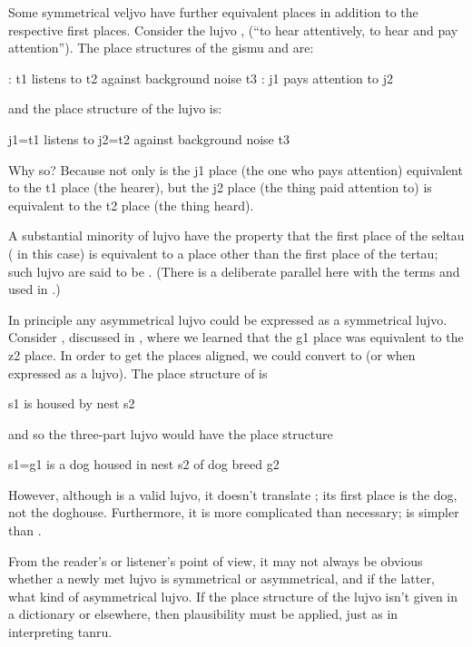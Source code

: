 Some symmetrical veljvo have further equivalent places in
    addition to the respective first places. Consider the lujvo
    ,  (``to hear attentively, to hear and
    pay attention''). The place structures of the gismu 
    and  are:
\begin{example}
: t1 listens to t2 against background noise t3\n
{}: j1 pays attention to j2
\end{example}

{\noindent}and the place structure of the lujvo is:
\begin{example}
j1=t1 listens to j2=t2 against background noise t3
\end{example}

Why so? Because not only is the j1 place (the one who pays
    attention) equivalent to the t1 place (the hearer), but the j2
    place (the thing paid attention to) is equivalent to the t2
    place (the thing heard).

A substantial minority of lujvo have the property that the
    first place of the seltau ( in this case) is
    equivalent to a place other than the first place of the tertau;
    such lujvo are said to be . (There is a
    deliberate parallel here with the terms 
    and  used in .)

In principle any asymmetrical lujvo could be expressed as a
    symmetrical lujvo. Consider , discussed in , where we learned that the g1 place
    was equivalent to the z2 place. In order to get the places
    aligned, we could convert  to  (or
     when expressed as a lujvo). The place structure of
     is
\begin{example}
s1 is housed by nest s2
\end{example}

{\noindent}and so the three-part lujvo  would have the place
    structure
\begin{example}
s1=g1 is a dog housed in nest s2 of dog breed g2
\end{example}

However, although  is a valid lujvo, it doesn't
    translate ; its first place is the dog, not the
    doghouse. Furthermore, it is more complicated than necessary;
     is simpler than .

From the reader's or listener's point of view, it may not
    always be obvious whether a newly met lujvo is symmetrical or
    asymmetrical, and if the latter, what kind of asymmetrical
    lujvo. If the place structure of the lujvo isn't given in a
    dictionary or elsewhere, then plausibility must be applied,
    just as in interpreting tanru.

